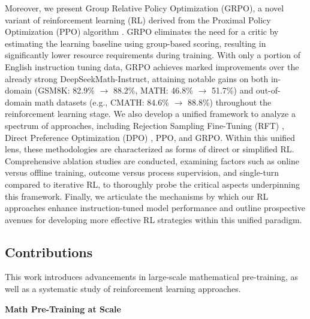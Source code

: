 Moreover, we present Group Relative Policy Optimization (GRPO), a novel variant of reinforcement learning (RL) derived from the Proximal Policy Optimization (PPO) algorithm \citep{schulman2017proximal}. GRPO eliminates the need for a critic by estimating the learning baseline using group-based scoring, resulting in significantly lower resource requirements during training. With only a portion of English instruction tuning data, GRPO achieves marked improvements over the already strong DeepSeekMath-Instruct, attaining notable gains on both in-domain (GSM8K: 82.9\% $\rightarrow$ 88.2\%, MATH: 46.8\% $\rightarrow$ 51.7\%) and out-of-domain math datasets (e.g., CMATH: 84.6\% $\rightarrow$ 88.8\%) throughout the reinforcement learning stage. We also develop a unified framework to analyze a spectrum of approaches, including Rejection Sampling Fine-Tuning (RFT) \citep{yuan2023scaling}, Direct Preference Optimization (DPO) \citep{dpo}, PPO, and GRPO. Within this unified lens, these methodologies are characterized as forms of direct or simplified RL. Comprehensive ablation studies are conducted, examining factors such as online versus offline training, outcome versus process supervision, and single-turn compared to iterative RL, to thoroughly probe the critical aspects underpinning this framework. Finally, we articulate the mechanisms by which our RL approaches enhance instruction-tuned model performance and outline prospective avenues for developing more effective RL strategies within this unified paradigm.

\subsection{Contributions}
This work introduces advancements in large-scale mathematical pre-training, as well as a systematic study of reinforcement learning approaches.

\textbf{Math Pre-Training at Scale}

